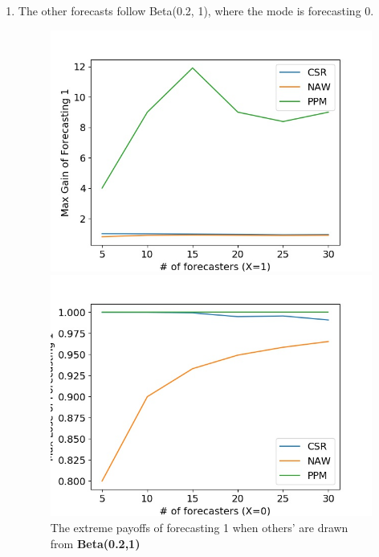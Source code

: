 \documentclass[english,10pt]{article}
\begin{document}
\begin{enumerate}
	\item The other forecasts follow Beta(0.2, 1), where the mode is forecasting 0.
	\begin{figure}[H]
        	\centering
        	\begin{minipage}{0.48\textwidth}
        	\includegraphics[width = \textwidth]{(Beta(0dot2_1)F_UnifW)Max_gain_of_forecasting_1.jpg}
        	\end{minipage}
        	\begin{minipage}{0.48\textwidth}
        	\includegraphics[width = \textwidth]{(Beta(0dot2_1)F_UnifW)Max_lose_of_forecasting_1.jpg}
        	\end{minipage}
        	\caption{The  extreme payoffs of forecasting 1 when others' are drawn from \textbf{Beta(0.2,1)}}
        	\end{figure}
	

\end{enumerate}
\end{document}
